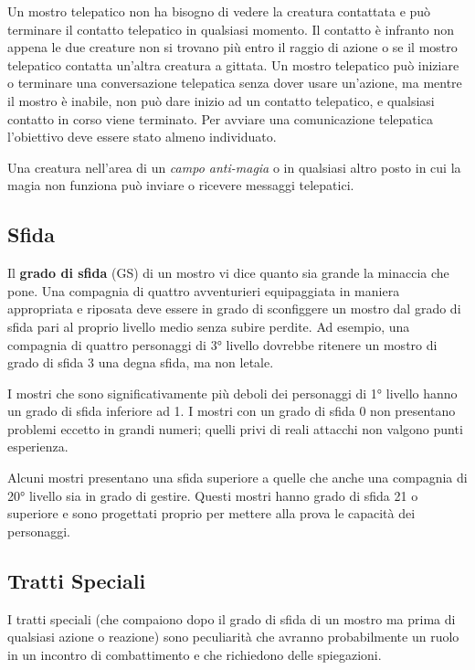 \begin{multicols}{2}
	Un mostro telepatico non ha bisogno di vedere la creatura contattata e può terminare il contatto telepatico in qualsiasi momento. Il contatto è infranto non appena le due creature non si trovano più entro il raggio di azione o se il mostro telepatico contatta un'altra creatura a gittata. Un mostro telepatico può iniziare o terminare una conversazione telepatica senza dover usare un'azione, ma mentre il mostro è inabile, non può dare inizio ad un contatto telepatico, e qualsiasi contatto in corso viene terminato. Per avviare una comunicazione telepatica l'obiettivo deve essere stato almeno individuato.

	Una creatura nell'area di un \textit{campo anti-magia} o in qualsiasi altro posto in cui la magia non funziona può inviare o ricevere messaggi telepatici.

	\subsection{Sfida}

	Il \textbf{grado di sfida} (GS) di un mostro vi dice quanto sia grande la minaccia che pone. Una compagnia di quattro avventurieri equipaggiata in maniera appropriata e riposata deve essere in grado di sconfiggere un mostro dal grado di sfida pari al proprio livello medio senza subire perdite. Ad esempio, una compagnia di quattro personaggi di 3° livello dovrebbe ritenere un mostro di grado di sfida 3 una degna sfida, ma non letale.

	I mostri che sono significativamente più deboli dei personaggi di 1° livello hanno un grado di sfida inferiore ad 1. I mostri con un grado di sfida 0 non presentano problemi eccetto in grandi numeri; quelli privi di reali attacchi non valgono punti esperienza.

	Alcuni mostri presentano una sfida superiore a quelle che anche una compagnia di 20° livello sia in grado di gestire. Questi mostri hanno grado di sfida 21 o superiore e sono progettati proprio per mettere alla prova le capacità dei personaggi.

	\subsection{Tratti Speciali}

	I tratti speciali (che compaiono dopo il grado di sfida di un mostro ma prima di qualsiasi azione o reazione) sono peculiarità che avranno probabilmente un ruolo in un incontro di combattimento e che richiedono delle spiegazioni.


\end{multicols}
